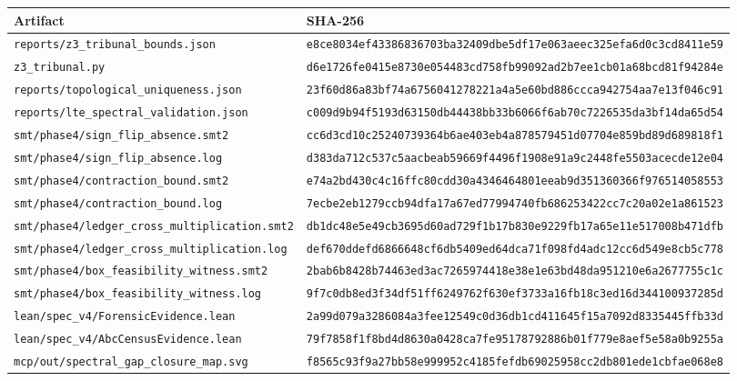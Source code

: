 \documentclass[11pt]{article}
\newcommand{\code}[1]{\texttt{#1}}
\begin{document}
\begin{center}
\begin{tabular}{@{}ll@{}}
\toprule
Artifact & SHA-256 \\
\midrule
\code{reports/z3\_tribunal\_bounds.json} & \code{e8ce8034ef43386836703ba32409dbe5df17e063aeec325efa6d0c3cd8411e59} \\
\code{z3\_tribunal.py} & \code{d6e1726fe0415e8730e054483cd758fb99092ad2b7ee1cb01a68bcd81f94284e} \\
\code{reports/topological\_uniqueness.json} & \code{23f60d86a83bf74a6756041278221a4a5e60bd886ccca942754aa7e13f046c91} \\
\code{reports/lte\_spectral\_validation.json} & \code{c009d9b94f5193d63150db44438bb33b6066f6ab70c7226535da3bf14da65d54} \\
\code{smt/phase4/sign\_flip\_absence.smt2} & \code{cc6d3cd10c25240739364b6ae403eb4a878579451d07704e859bd89d689818f1} \\
\code{smt/phase4/sign\_flip\_absence.log} & \code{d383da712c537c5aacbeab59669f4496f1908e91a9c2448fe5503acecde12e04} \\
\code{smt/phase4/contraction\_bound.smt2} & \code{e74a2bd430c4c16ffc80cdd30a4346464801eeab9d351360366f976514058553} \\
\code{smt/phase4/contraction\_bound.log} & \code{7ecbe2eb1279ccb94dfa17a67ed77994740fb686253422cc7c20a02e1a861523} \\
\code{smt/phase4/ledger\_cross\_multiplication.smt2} & \code{db1dc48e5e49cb3695d60ad729f1b17b830e9229fb17a65e11e517008b471dfb} \\
\code{smt/phase4/ledger\_cross\_multiplication.log} & \code{def670ddefd6866648cf6db5409ed64dca71f098fd4adc12cc6d549e8cb5c778} \\
\code{smt/phase4/box\_feasibility\_witness.smt2} & \code{2bab6b8428b74463ed3ac7265974418e38e1e63bd48da951210e6a2677755c1c} \\
\code{smt/phase4/box\_feasibility\_witness.log} & \code{9f7c0db8ed3f34df51ff6249762f630ef3733a16fb18c3ed16d344100937285d} \\
\code{lean/spec\_v4/ForensicEvidence.lean} & \code{2a99d079a3286084a3fee12549c0d36db1cd411645f15a7092d8335445ffb33d} \\
\code{lean/spec\_v4/AbcCensusEvidence.lean} & \code{79f7858f1f8bd4d8630a0428ca7fe95178792886b01f779e8aef5e58a0b9255a} \\
\code{mcp/out/spectral\_gap\_closure\_map.svg} & \code{f8565c93f9a27bb58e999952c4185fefdb69025958cc2db801ede1cbfae068e8} \\
\bottomrule
\end{tabular}
\end{center}
\end{document}
